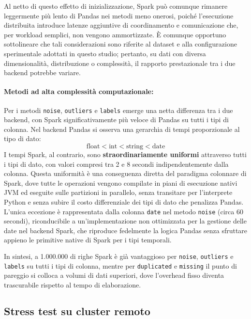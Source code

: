 \documentclass[../main.tex]{subfiles}
\begin{document}
Al netto di questo effetto di inizializzazione, Spark può comunque rimanere leggermente più lento di Pandas nei metodi meno onerosi, poiché l'esecuzione distribuita introduce latenze aggiuntive di coordinamento e comunicazione che, per workload semplici, non vengono ammortizzate. È comunque opportuno sottolineare che tali considerazioni sono riferite al dataset e alla configurazione sperimentale adottati in questo studio; pertanto, su dati con diversa dimensionalità, distribuzione o complessità, il rapporto prestazionale tra i due backend potrebbe variare.


\paragraph{Metodi ad alta complessità computazionale: } Per i metodi \texttt{noise}, 
\texttt{outliers} e \texttt{labels} emerge una netta differenza tra i due backend, con Spark significativamente più veloce di Pandas su tutti i tipi di colonna. Nel backend Pandas si osserva una gerarchia di tempi proporzionale al tipo di dato:$$\text{float} < \text{int} < \text{string} < \text{date}$$I tempi Spark, al contrario, sono \textbf{straordinariamente uniformi} attraverso tutti i tipi di dato, con valori compresi tra 2 e 8 secondi indipendentemente dalla colonna. Questa uniformità è una conseguenza diretta del paradigma colonnare di Spark, dove tutte le operazioni vengono compilate in piani di esecuzione nativi JVM ed eseguite sulle partizioni in parallelo, senza transitare per l'interprete Python e senza subire il costo differenziale dei tipi di dato che penalizza Pandas.
\label{paragraph:eccezioneColonnaDate}
L'unica eccezione è rappresentata dalla colonna \texttt{date} nel metodo \texttt{noise} (circa 60 secondi), riconducibile a un'implementazione non ottimizzata per la gestione delle date nel backend Spark, che riproduce fedelmente la logica Pandas senza sfruttare appieno le primitive native di Spark per i tipi temporali.

In sintesi, a 1.000.000 di righe Spark è già vantaggioso per \texttt{noise}, \texttt{outliers} e \texttt{labels} su tutti i tipi di colonna, mentre per \texttt{duplicated} e \texttt{missing} il punto di pareggio si colloca a volumi di dati superiori, dove l'overhead fisso diventa trascurabile rispetto al tempo di elaborazione.

\subsection{Stress test su cluster remoto}
\label{subsec:stress_test}
\end{document}
